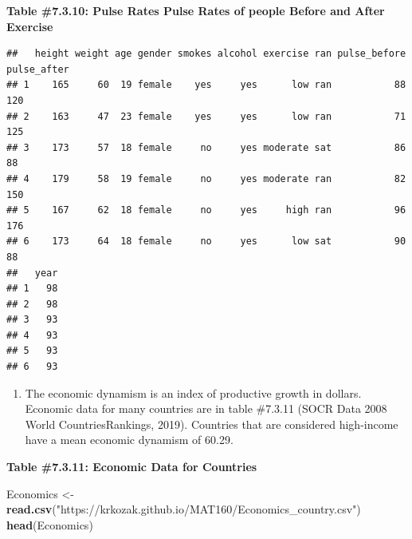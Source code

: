 \documentclass[
]{book}
\newenvironment{Shaded}{\begin{snugshade}}{\end{snugshade}}
\newcommand{\KeywordTok}[1]{\textcolor[rgb]{0.13,0.29,0.53}{\textbf{#1}}}
\newcommand{\NormalTok}[1]{#1}
\newcommand{\OperatorTok}[1]{\textcolor[rgb]{0.81,0.36,0.00}{\textbf{#1}}}
\newcommand{\StringTok}[1]{\textcolor[rgb]{0.31,0.60,0.02}{#1}}
\providecommand{\tightlist}{%
  \setlength{\itemsep}{0pt}\setlength{\parskip}{0pt}}
\begin{document}
\textbf{Table \#7.3.10: Pulse Rates Pulse Rates of people Before and After Exercise}

\begin{Shaded}
\end{Shaded}

\begin{verbatim}
##   height weight age gender smokes alcohol exercise ran pulse_before pulse_after
## 1    165     60  19 female    yes     yes      low ran           88         120
## 2    163     47  23 female    yes     yes      low ran           71         125
## 3    173     57  18 female     no     yes moderate sat           86          88
## 4    179     58  19 female     no     yes moderate ran           82         150
## 5    167     62  18 female     no     yes     high ran           96         176
## 6    173     64  18 female     no     yes      low sat           90          88
##   year
## 1   98
## 2   98
## 3   93
## 4   93
## 5   93
## 6   93
\end{verbatim}

\begin{enumerate}
\def\labelenumi{\arabic{enumi}.}
\setcounter{enumi}{4}
\tightlist
\item
  The economic dynamism is an index of productive growth in dollars. Economic data for many countries are in table \#7.3.11 (SOCR Data 2008 World CountriesRankings, 2019). Countries that are considered high-income have a mean economic dynamism of 60.29.
\end{enumerate}

\textbf{Table \#7.3.11: Economic Data for Countries}

\begin{Shaded}
\begin{Highlighting}[]
\NormalTok{Economics <-}\StringTok{ }\KeywordTok{read.csv}\NormalTok{(}\StringTok{"https://krkozak.github.io/MAT160/Economics_country.csv"}\NormalTok{)}
\KeywordTok{head}\NormalTok{(Economics)}
\end{Highlighting}
\end{Shaded}
\end{document}
